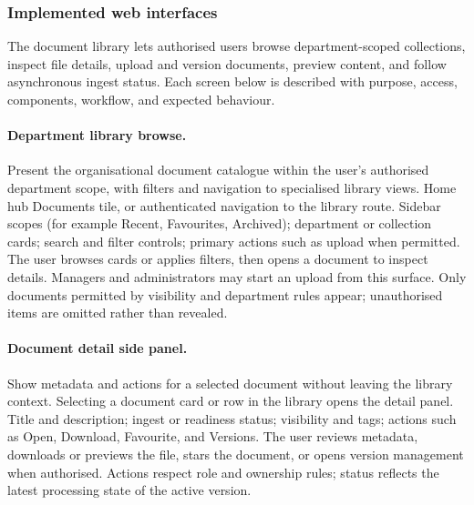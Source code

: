 \subsubsection{Implemented web interfaces}
\label{subsubsec:impl-s2-ui}

The document library lets authorised users browse department-scoped collections,
inspect file details, upload and version documents, preview content, and follow
asynchronous ingest status. Each screen below is described with purpose, access,
components, workflow, and expected behaviour.

\paragraph{Department library browse.}
\uiexplain
{Present the organisational document catalogue within the user's authorised
department scope, with filters and navigation to specialised library views.}
{Home hub Documents tile, or authenticated navigation to the library route.}
{Sidebar scopes (for example Recent, Favourites, Archived); department or
collection cards; search and filter controls; primary actions such as upload when
permitted.}
{The user browses cards or applies filters, then opens a document to inspect
details. Managers and administrators may start an upload from this surface.}
{Only documents permitted by visibility and department rules appear; unauthorised
items are omitted rather than revealed.}

\paragraph{Document detail side panel.}
\uiexplain
{Show metadata and actions for a selected document without leaving the library
context.}
{Selecting a document card or row in the library opens the detail panel.}
{Title and description; ingest or readiness status; visibility and tags; actions
such as Open, Download, Favourite, and Versions.}
{The user reviews metadata, downloads or previews the file, stars the document,
or opens version management when authorised.}
{Actions respect role and ownership rules; status reflects the latest processing
state of the active version.}

